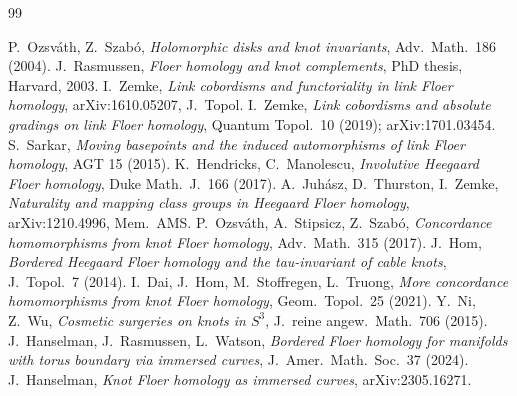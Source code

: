 \begin{thebibliography}{99}\small

 P.~Ozsv\'ath, Z.~Szab\'o, \emph{Holomorphic disks and knot invariants}, Adv.\ Math.\ 186 (2004).
 J.~Rasmussen, \emph{Floer homology and knot complements}, PhD thesis, Harvard, 2003.
 I.~Zemke, \emph{Link cobordisms and functoriality in link Floer homology}, arXiv:1610.05207, J.\ Topol.
 I.~Zemke, \emph{Link cobordisms and absolute gradings on link Floer homology}, Quantum Topol.\ 10 (2019); arXiv:1701.03454.
 S.~Sarkar, \emph{Moving basepoints and the induced automorphisms of link Floer homology}, AGT 15 (2015).
 K.~Hendricks, C.~Manolescu, \emph{Involutive Heegaard Floer homology}, Duke Math.\ J.\ 166 (2017).
 A.~Juh\'asz, D.~Thurston, I.~Zemke, \emph{Naturality and mapping class groups in Heegaard Floer homology}, arXiv:1210.4996, Mem.\ AMS.
 P.~Ozsv\'ath, A.~Stipsicz, Z.~Szab\'o, \emph{Concordance homomorphisms from knot Floer homology}, Adv.\ Math.\ 315 (2017).
 J.~Hom, \emph{Bordered Heegaard Floer homology and the tau-invariant of cable knots}, J.\ Topol.\ 7 (2014).
 I.~Dai, J.~Hom, M.~Stoffregen, L.~Truong, \emph{More concordance homomorphisms from knot Floer homology}, Geom.\ Topol.\ 25 (2021).
 Y.~Ni, Z.~Wu, \emph{Cosmetic surgeries on knots in $S^3$}, J.\ reine angew.\ Math.\ 706 (2015).
 J.~Hanselman, J.~Rasmussen, L.~Watson, \emph{Bordered Floer homology for manifolds with torus boundary via immersed curves}, J.\ Amer.\ Math.\ Soc.\ 37 (2024).
 J.~Hanselman, \emph{Knot Floer homology as immersed curves}, arXiv:2305.16271.


\end{thebibliography}

